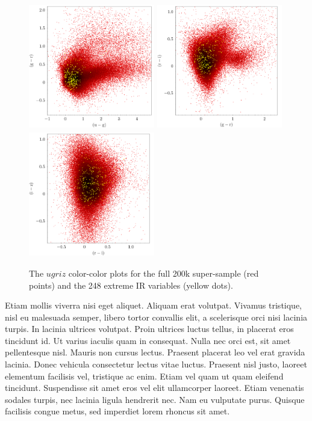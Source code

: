 \documentclass{emulateapj}
\begin{document}
    \begin{figure}
      \includegraphics[width=5.50cm, height=5.50cm, trim=0.0cm 0.0cm 0.0cm 0.0cm, clip]
      {../color_color/colorcolor_ugr_topcat.png}
      \includegraphics[width=5.50cm, height=5.50cm, trim=0.0cm 0.0cm 0.0cm 0.0cm, clip]
      {../color_color/colorcolor_gri_topcat.png}
      \includegraphics[width=5.50cm, height=5.50cm, trim=0.0cm 0.0cm 0.0cm 0.0cm, clip]
      {../color_color/colorcolor_riz_topcat.png}
      \centering
      \caption[]{The $ugriz$ color-color plots for the full 200k
        super-sample (red points) and the 248 extreme IR variables (yellow
        dots).}
      \label{fig:ugriz_colorcolor}
    \end{figure}
    Etiam mollis viverra nisi eget aliquet. Aliquam erat volutpat. Vivamus
    tristique, nisl eu malesuada semper, libero tortor convallis elit, a
    scelerisque orci nisi lacinia turpis. In lacinia ultrices
    volutpat. Proin ultrices luctus tellus, in placerat eros tincidunt
    id. Ut varius iaculis quam in consequat. Nulla nec orci est, sit amet
    pellentesque nisl. Mauris non cursus lectus. Praesent placerat leo vel
    erat gravida lacinia. Donec vehicula consectetur lectus vitae
    luctus. Praesent nisl justo, laoreet elementum facilisis vel,
    tristique ac enim. Etiam vel quam ut quam eleifend
    tincidunt. Suspendisse sit amet eros vel elit ullamcorper
    laoreet. Etiam venenatis sodales turpis, nec lacinia ligula hendrerit
    nec. Nam eu vulputate purus. Quisque facilisis congue metus, sed
    imperdiet lorem rhoncus sit amet.
    
\end{document}

